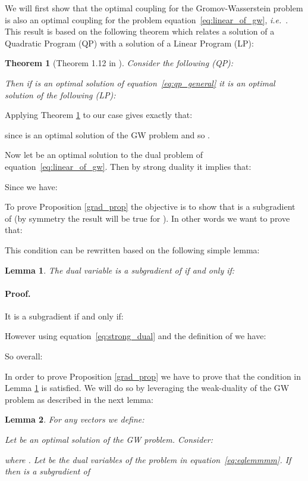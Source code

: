 \documentclass{article}
\def\eqref#1{equation~\ref{#1}}
\newcommand{\ie}{\textit{i.e.}}
\newtheorem{lemma}{Lemma}
\newtheorem{theorem}{Theorem}
\begin{document}
	We will first show that the optimal coupling for the Gromov-Wasserstein problem is also an optimal coupling for the problem \eqref{eq:linear_of_gw}, \ie\ . This result is based on the following theorem which relates a solution of a Quadratic Program (QP) with a solution of a Linear Program (LP):
	\begin{theorem}[Theorem 1.12 in \cite{murty-linear-1988}]
		\label{murty_theo}
		Consider the following (QP):
		
		Then if  is an optimal solution of \eqref{eq:qp_general} it is an optimal solution of the following (LP):
		
	\end{theorem}
	
	Applying Theorem \ref{murty_theo} to our case gives exactly that: 
	
	since  is an optimal solution of the GW problem and so . 
	
	
	
	Now let  be an optimal solution to the dual problem of \eqref{eq:linear_of_gw}. Then by strong duality it implies that:
	
	Since  we have:
	
	To prove Proposition \ref{grad_prop} the objective is to show that  is a subgradient of  (by symmetry the result will be true for ). In other words we want to prove that:
	
	This condition can be rewritten based on the following simple lemma:
	\begin{lemma}
		\label{lemmaone}
		The dual variable  is a subgradient of  if and only if:
		
	\end{lemma}
	
	\paragraph{Proof.}
	It is a subgradient if and only if:
	
	However using \eqref{eq:strong_dual} and the definition of  we have:
	
	So overall:
	
	
	
	In order to prove Proposition \ref{grad_prop} we have to prove that the condition in Lemma \ref{lemmaone} is satisfied. We will do so by leveraging the weak-duality of the GW problem as described in the next lemma:
	\begin{lemma}
		For any vectors  we define: 
		
		Let  be an optimal solution of the GW problem. Consider:
		
		where . Let  be the dual variables of the problem in \eqref{eq:eqlemmmm}. If  then  is a subgradient of 
	\end{lemma}
\end{document}
